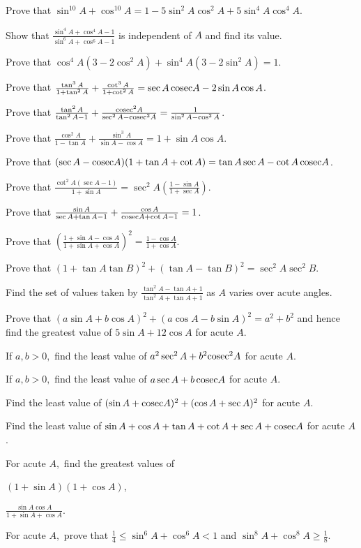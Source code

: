 \item Prove that $\sin^{10} A + \cos^{10} A = 1 - 5\sin^2 A\cos^2 A + 5\sin^4 A\cos^4 A$.
\item Show that $\frac{\sin^4 A + \cos^4 A - 1}{\sin^6 A + \cos^6 A - 1}$ is independent of $A$ and find its value.
\item Prove that $\cos^4 A(3 - 2\cos^2 A) + \sin^4 A(3 - 2\sin^2 A) = 1$.
\item Prove that $\frac{\tan^3 A}{1 + \tan^2 A} + \frac{\cot^3 A}{1 + \cot^2 A} = \sec A\,{\rm cosec} A - 2\sin A\cos A$.
\item Prove that $\frac{\tan^2 A}{\tan^2 A - 1} + \frac{{\rm cosec}^2 A}{\sec^2 A - {\rm cosec}^2 A} = \frac{1}{\sin^2 A -
    \cos^2 A}$.
\item Prove that $\frac{\cos^2 A}{1 - \tan A} + \frac{\sin^3 A}{\sin A - \cos A} = 1 + \sin A\cos A$.
\item Prove that $(\sec A - {\rm cosec} A)(1 + \tan A + \cot A) = \tan A\sec A - \cot A\,{\rm cosec} A$.
\item Prove that $\frac{\cot^2 A(\sec A - 1)}{1 + \sin A} = \sec^2 A\left(\frac{1 - \sin A}{1 + \sec A}\right)$.
\item Prove that $\frac{\sin A}{\sec A + \tan A - 1} + \frac{\cos A}{{\rm cosec} A + \cot A - 1} = 1$.
\item Prove that $\left(\frac{1 + \sin A - \cos A}{1 + \sin A + \cos A}\right)^2 = \frac{1 - \cos A}{1 + \cos A}$.
\item Prove that $(1 + \tan A\tan B)^2 + (\tan A - \tan B)^2 = \sec^2 A\sec^2 B$.
\item Find the set of values taken by $\frac{\tan^2 A - \tan A + 1}{\tan^2 A + \tan A + 1}$ as $A$ varies over acute angles.
\item Prove that $(a\sin A + b\cos A)^2 + (a\cos A - b\sin A)^2 = a^2 + b^2$ and hence find the greatest value of $5\sin A +
    12\cos A$ for acute $A$.
\item If $a, b > 0,$ find the least value of $a^2\sec^2 A + b^2{\rm cosec}^2 A$ for acute $A$.
\item If $a, b > 0,$ find the least value of $a\sec A + b\,{\rm cosec} A$ for acute $A$.
\item Find the least value of $(\sin A + {\rm cosec} A)^2 + (\cos A + \sec A)^2$ for acute $A$.
\item Find the least value of $\sin A + \cos A + \tan A + \cot A + \sec A + {\rm cosec} A$ for acute $A$.
\item For acute $A,$ find the greatest values of
  \startitemize[i]
    \item $(1 + \sin A)(1 + \cos A)$,
    \item $\frac{\sin A\cos A}{1 + \sin A + \cos A}$.
  \stopitemize
\item For acute $A,$ prove that $\frac{1}{4}\leq \sin^6 A + \cos^6 A < 1$ and $\sin^8 A + \cos^8 A \geq \frac{1}{8}$.
\stopitemize

